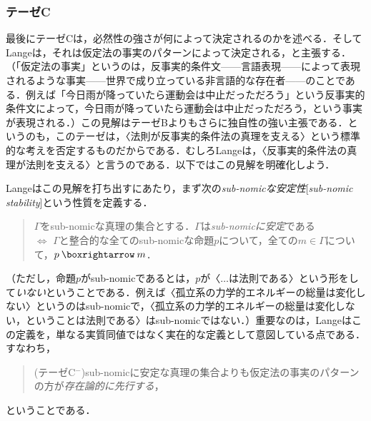 \documentclass[dvipdfmx,twoside,11pt,uplatex]{jsarticle}
\newcommand{\myterm}[2]{{\emph{#1}}{[\emph{#2}]}}
\theoremstyle{definition}
\begin{document}


\subsubsection{テーゼC}\label{c}
最後にテーゼCは，必然性の強さが何によって決定されるのかを述べる．そしてLangeは，それは仮定法の事実のパターンによって決定される，と主張する．（「仮定法の事実」というのは，反事実的条件文------言語表現------によって表現されるような事実------世界で成り立っている非言語的な存在者------のことである．例えば「今日雨が降っていたら運動会は中止だっただろう」という反事実的条件文によって，今日雨が降っていたら運動会は中止だっただろう，という事実が表現される．）この見解はテーゼBよりもさらに独自性の強い主張である．というのも，このテーゼは，〈法則が反事実的条件法の真理を支える〉という標準的な考えを否定するものだからである．むしろLangeは，〈反事実的条件法の真理が法則を支える〉と言うのである．以下ではこの見解を明確化しよう．

Langeはこの見解を打ち出すにあたり，まず次の\myterm{sub-nomicな安定性}{sub-nomic stability}という性質を定義する\citep[29]{lange2009lawmakers}．
\begin{quote}
    $\Gamma$をsub-nomicな真理の集合とする．$\Gamma$は\emph{sub-nomicに安定}である\\
    $\Longleftrightarrow$ $\Gamma$と整合的な全てのsub-nomicな命題$p$について，全ての$m\in\Gamma$について，$p\necif m$．
\end{quote}
（ただし，命題$p$がsub-nomicであるとは，$p$が〈$\ldots$は法則である〉という形をして\emph{いない}ということである．例えば〈孤立系の力学的エネルギーの総量は変化しない〉というのはsub-nomicで，〈孤立系の力学的エネルギーの総量は変化しない，ということは法則である〉はsub-nomicではない．）重要なのは，Langeはこの定義を，単なる実質同値ではなく実在的な定義として意図している点である．すなわち，
\begin{quote}
    (テーゼC$^{-}$)\quad sub-nomicに安定な真理の集合よりも仮定法の事実のパターンの方が\emph{存在論的に先行する}，
\end{quote}
ということである．
\end{document}
